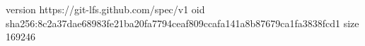 version https://git-lfs.github.com/spec/v1
oid sha256:8c2a37dae68983fe21ba20fa7794ceaf809ccafa141a8b87679ca1fa3838fcd1
size 169246
